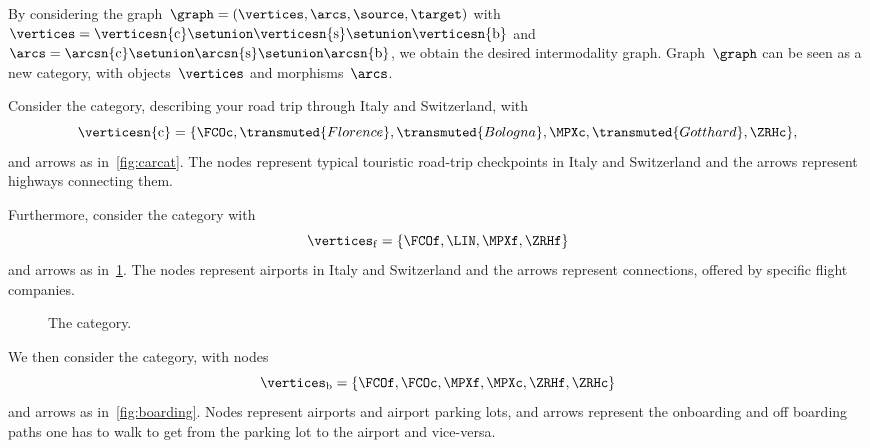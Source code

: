 By considering the graph~$\graph=(\vertices,\arcs,\source,\target)$ with~$\vertices=\verticesn{\mathrm{c}}\setunion \verticesn{\mathrm{s}}\setunion \verticesn{\mathrm{b}}$ and~$\arcs=\arcsn{\mathrm{c}}\setunion \arcsn{\mathrm{s}}\setunion \arcsn{\mathrm{b}}$, we obtain the desired intermodality graph.
Graph~$\graph$ can be seen as a new category, with objects~$\vertices$ and morphisms~$\arcs$.
\begin{example}
    \label{exa:car-category}
    Consider the \Car category, describing your road trip through Italy and Switzerland, with
    \begin{equation*}
        \verticesn{\mathrm{c}}=
        \{
        \FCOc,
        \transmuted{Florence},
        \transmuted{Bologna},
        \MPXc,
        \transmuted{Gotthard},
        \ZRHc
        \},
    \end{equation*}
    and arrows as in~\cref{fig:carcat}.
    The nodes represent typical touristic road-trip checkpoints in Italy and Switzerland and the arrows represent highways connecting them.

    \begin{figure*}[h!]
        \caption{The \Car category.}
        \label{fig:carcat}
    \end{figure*}

    Furthermore, consider the \Flight category with
    \begin{equation}
        \vertices_\mathrm{f}
        = \{
        \FCOf,
        \LIN,
        \MPXf,
        \ZRHf
        \}
    \end{equation}
    and arrows as in~\cref{fig:flight}.
    The nodes represent airports in Italy and Switzerland and the arrows represent connections, offered by specific flight companies.

    \begin{figure}[h!]
        \centering
        \caption{The \Flight category.}
        \label{fig:flight}
    \end{figure}

    We then consider the \Board category, with nodes
    \begin{equation*}
        \vertices_\mathrm{b}=\{\FCOf,\FCOc,\MPXf,\MPXc,\ZRHf,\ZRHc\}
    \end{equation*}
    and arrows as in~\cref{fig:boarding}.
    Nodes represent airports and airport parking lots, and arrows represent the onboarding and off boarding paths one has to walk to get from the parking lot to the airport and vice-versa.


\end{example}
